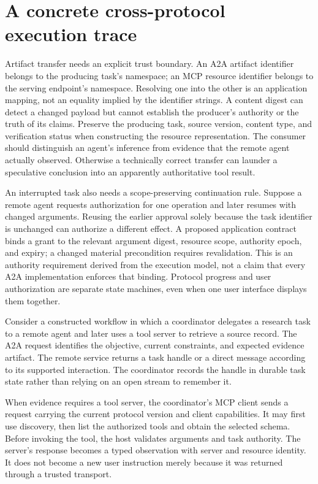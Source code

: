 \section{A concrete cross-protocol execution trace}\label{sec:C19:trace}
Artifact transfer needs an explicit trust boundary. An A2A artifact identifier belongs to the producing task's namespace; an MCP resource identifier belongs to the serving endpoint's namespace. Resolving one into the other is an application mapping, not an equality implied by the identifier strings. A content digest can detect a changed payload but cannot establish the producer's authority or the truth of its claims. Preserve the producing task, source version, content type, and verification status when constructing the resource representation. The consumer should distinguish an agent's inference from evidence that the remote agent actually observed. Otherwise a technically correct transfer can launder a speculative conclusion into an apparently authoritative tool result.

An interrupted task also needs a scope-preserving continuation rule. Suppose a remote agent requests authorization for one operation and later resumes with changed arguments. Reusing the earlier approval solely because the task identifier is unchanged can authorize a different effect. A proposed application contract binds a grant to the relevant argument digest, resource scope, authority epoch, and expiry; a changed material precondition requires revalidation. This is an authority requirement derived from the execution model, not a claim that every A2A implementation enforces that binding. Protocol progress and user authorization are separate state machines, even when one user interface displays them together.

Consider a constructed workflow in which a coordinator delegates a research task to a remote agent and later uses a tool server to retrieve a source record. The A2A request identifies the objective, current constraints, and expected evidence artifact. The remote service returns a task handle or a direct message according to its supported interaction. The coordinator records the handle in durable task state rather than relying on an open stream to remember it.

When evidence requires a tool server, the coordinator's MCP client sends a request carrying the current protocol version and client capabilities. It may first use discovery, then list the authorized tools and obtain the selected schema. Before invoking the tool, the host validates arguments and task authority. The server's response becomes a typed observation with server and resource identity. It does not become a new user instruction merely because it was returned through a trusted transport.

